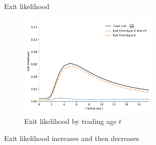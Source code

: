 \documentclass{beamer}
\begin{document}



\begin{frame}{Exit likelihood}
\begin{figure}[h!]
		\includegraphics[width= 0.6\textwidth]{figures/ExitlikeliPy}
		\caption{Exit likelihood by trading age $t$}
		\label{fig:Exitlikeli}
\end{figure}

Exit likelihood increases and then decreases
\end{frame}
\end{document}
